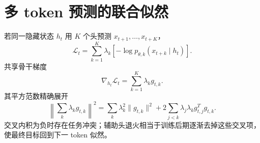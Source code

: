\documentclass[11pt]{article}
\numberwithin{equation}{section}
\newcommand{\1}{\mathbf{1}}
\newcommand{\cL}{\mathcal{L}}
\begin{document}
\section{多 token 预测的联合似然}

若同一隐藏状态 $h_t$ 用 $K$ 个头预测 $x_{t+1},\ldots,x_{t+K}$，
\begin{equation}
 \cL_t=\sum_{k=1}^{K}\lambda_k
 [-\log p_{\theta,k}(x_{t+k}\mid h_t)].
\end{equation}
共享骨干梯度
\begin{equation}
 \nabla_{h_t}\cL_t=\sum_{k=1}^{K}\lambda_k g_{t,k}.
\end{equation}
其平方范数精确展开
\begin{equation}
 \left\|\sum_k\lambda_kg_{t,k}\right\|^2
 =\sum_k\lambda_k^2\|g_{t,k}\|^2
 +2\sum_{j<k}\lambda_j\lambda_k g_{t,j}^Tg_{t,k}.
\end{equation}
交叉内积为负时存在任务冲突；辅助头退火相当于训练后期逐渐去掉这些交叉项，
使最终目标回到下一 token 似然。
\end{document}
